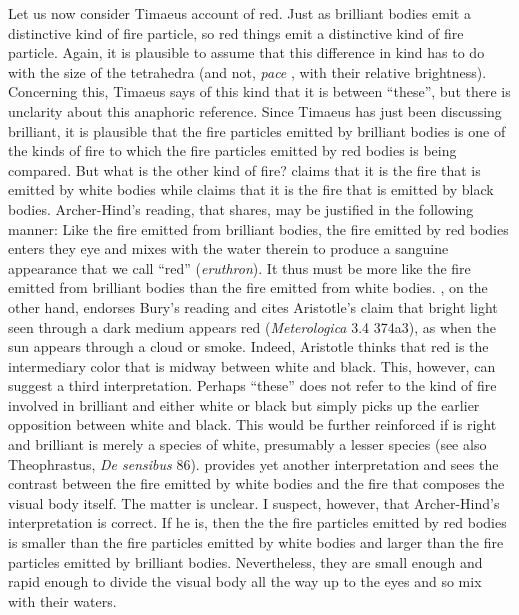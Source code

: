 Let us now consider Timaeus account of red. Just as brilliant bodies emit a distinctive kind of fire particle, so red things emit a distinctive kind of fire particle. Again, it is plausible to assume that this difference in kind has to do with the size of the tetrahedra  (and not, \emph{pace} \citealt[128]{Ierodiakonou:2009cg}, with their relative brightness). Concerning this, Timaeus says of this kind that it is between ``these'', but there is unclarity about this anaphoric reference. Since Timaeus has just been discussing brilliant, it is plausible that the fire particles emitted by brilliant bodies is one of the kinds of fire to which the fire particles emitted by red bodies is being compared. But what is the other kind of fire? \citet[250 n8]{Archer-Hind:1888qd} claims that it is the fire that is emitted by white bodies while \citet[67 n3]{Bury:1929jb} claims that it is the fire that is emitted by black bodies. Archer-Hind's reading, that \citet[168]{Brisson:1997qr} shares, may be justified in the following manner: Like the fire emitted from brilliant bodies, the fire emitted by red bodies enters they eye and mixes with the water therein to produce a sanguine appearance that we call ``red'' (\emph{eruthron}). It thus must be more like the fire emitted from brilliant bodies than the fire emitted from white bodies. \citet[277 n2]{Cornford:1935fk}, on the other hand, endorses Bury's reading and cites Aristotle's claim that bright light seen through a dark medium appears red (\emph{Meterologica} 3.4 374a3), as when the sun appears through a cloud or smoke. Indeed, Aristotle thinks that red is the intermediary color that is midway between white and black. This, however, can suggest a third interpretation. Perhaps ``these'' does not refer to the kind of fire involved in brilliant and either white or black but simply picks up the earlier opposition between white and black. This would be further reinforced if \citet[10--1]{Levides:2002aa} is right and brilliant is merely a species of white, presumably a lesser species (see also Theophrastus, \emph{De sensibus} 86). \citet[482]{Taylor:1928qb} provides yet another interpretation and sees the contrast between the fire emitted by white bodies and the fire that composes the visual body itself. The matter is unclear. I suspect, however, that Archer-Hind's interpretation is correct. If he is, then the the fire particles emitted by red bodies is smaller than the fire particles emitted by white bodies and larger than the fire particles emitted by brilliant bodies. Nevertheless, they are small enough and rapid enough to divide the visual body all the way up to the eyes and so mix with their waters.


